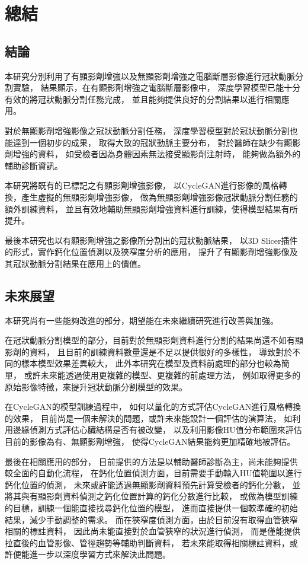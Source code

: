 \documentclass[class=NCU_thesis, crop=false]{standalone}
\begin{document}
\chapter{總結}
\section{結論}
本研究分別利用了有顯影劑增強以及無顯影劑增強之電腦斷層影像進行冠狀動脈分割實驗，
結果顯示，在有顯影劑增強之電腦斷層影像中，
深度學習模型已能十分有效的將冠狀動脈分割任務完成，
並且能夠提供良好的分割結果以進行相關應用。

對於無顯影劑增強影像之冠狀動脈分割任務，
深度學習模型對於冠狀動脈分割也能達到一個初步的成果，
取得大致的冠狀動脈主要分布，
對於醫師在缺少有顯影劑增強的資料，
如受檢者因為身體因素無法接受顯影劑注射時，
能夠做為額外的輔助診斷資訊。

本研究將既有的已標記之有顯影劑增強影像，
以CycleGAN進行影像的風格轉換，產生虛擬的無顯影劑增強影像，
做為無顯影劑增強影像冠狀動脈分割任務的額外訓練資料，
並且有效地輔助無顯影劑增強資料進行訓練，使得模型結果有所提升。

最後本研究也以有顯影劑增強之影像所分割出的冠狀動脈結果，
以3D Slicer插件的形式，實作鈣化位置偵測以及狹窄度分析的應用，
提升了有顯影劑增強影像及其冠狀動脈分割結果在應用上的價值。

\section{未來展望}
本研究尚有一些能夠改進的部分，期望能在未來繼續研究進行改善與加強。

在冠狀動脈分割模型的部分，目前對於無顯影劑資料進行分割的結果尚還不如有顯影劑的資料，
且目前的訓練資料數量還是不足以提供很好的多樣性，
導致對於不同的樣本模型效果差異較大，
此外本研究在模型及資料前處理的部分也較為簡單，
或許未來能透過使用更複雜的模型、更複雜的前處理方法，
例如取得更多的原始影像特徵，來提升冠狀動脈分割模型的效果。

在CycleGAN的模型訓練過程中，
如何以量化的方式評估CycleGAN進行風格轉換的效果，
目前尚是一個未解決的問題，或許未來能設計一個評估的演算法，
如利用邊緣偵測方式評估心臟結構是否有被改變，
以及利用影像HU值分布範圍來評估目前的影像為有、無顯影劑增強，
使得CycleGAN結果能夠更加精確地被評估。

最後在相關應用的部分，
目前提供的方法是以輔助醫師診斷為主，尚未能夠提供較全面的自動化流程，
在鈣化位置偵測方面，目前需要手動輸入HU值範圍以進行鈣化位置的偵測，
未來或許能透過無顯影劑資料預先計算受檢者的鈣化分數，
並將其與有顯影劑資料偵測之鈣化位置計算的鈣化分數進行比較，
或做為模型訓練的目標，訓練一個能直接找尋鈣化位置的模型，
進而直接提供一個較準確的初始結果，減少手動調整的需求。
而在狹窄度偵測方面，由於目前沒有取得血管狹窄相關的標註資料，
因此尚未能直接對於血管狹窄的狀況進行偵測，
而是僅能提供拉直後的血管影像、管徑趨勢等輔助判斷資料，
若未來能取得相關標註資料，或許便能進一步以深度學習方式來解決此問題。
\end{document}
